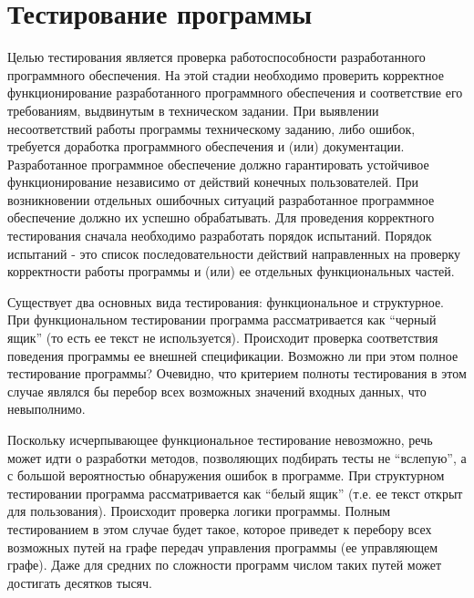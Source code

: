 \section{Тестирование программы} 
\label{sec:program_design}

Целью тестирования является проверка работоспособности разработанного программного обеспечения. На этой стадии необходимо проверить корректное функционирование разработанного программного обеспечения и соответствие его требованиям, выдвинутым в техническом задании. При выявлении несоответствий работы программы техническому заданию, либо ошибок, требуется доработка программного обеспечения и (или) документации. Разработанное программное обеспечение должно гарантировать устойчивое функционирование независимо от действий конечных пользователей. При возникновении отдельных ошибочных ситуаций разработанное программное обеспечение должно их успешно обрабатывать. Для проведения корректного тестирования сначала необходимо разработать порядок испытаний. Порядок испытаний - это список последовательности действий направленных на проверку корректности работы программы и (или) ее отдельных функциональных частей.

Существует два основных вида тестирования: функциональное и структурное. При функциональном тестировании программа рассматривается как “черный ящик” (то есть ее текст не используется). Происходит проверка соответствия поведения программы ее внешней спецификации. Возможно ли при этом полное тестирование программы? Очевидно, что критерием полноты тестирования в этом случае являлся бы перебор всех возможных значений входных данных, что невыполнимо. 

Поскольку исчерпывающее функциональное тестирование невозможно, речь может идти о разработки методов, позволяющих подбирать тесты не “вслепую”, а с большой вероятностью обнаружения ошибок в программе. При структурном тестировании программа рассматривается как “белый ящик” (т.е. ее текст открыт для пользования). Происходит проверка логики программы. Полным тестированием в этом случае будет такое, которое приведет к перебору всех возможных путей на графе передач управления программы (ее управляющем графе). Даже для средних по сложности программ числом таких путей может достигать десятков тысяч. 

